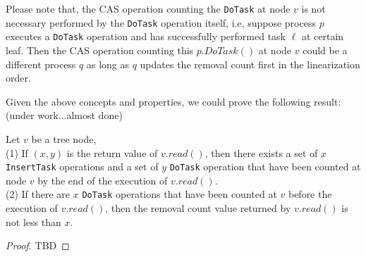 Please note that, the CAS operation counting the \texttt{DoTask} at node $v$ is not necessary performed by the \texttt{DoTask} operation itself, i.e, suppose process $p$ executes a \texttt{DoTask} operation and has successfully performed task $\ell$ at certain leaf. Then the CAS operation counting this $p.DoTask()$ at node $v$ could be a different process $q$ as long as $q$ updates the removal count first in the linearization order.

Given the above concepts and properties, we could prove the following result:
(under work...almost done)
\begin{lem}
Let $v$ be a tree node, \\
(1) If $(x, y)$ is the return value of $v.read( )$, then there exists a set of $x$ \texttt{InsertTask} operations and a set of $y$ \texttt{DoTask} operation that have been counted at node $v$ by the end of the execution of $v.read( )$.\\
\noindent (2) If there are $x$ \texttt{DoTask} operations that have been counted at $v$ before the execution of $v.read( )$, then the removal count value returned by $v.read( )$ is not less than $x$.
\end{lem}
\begin{proof}
TBD
\end{proof}



